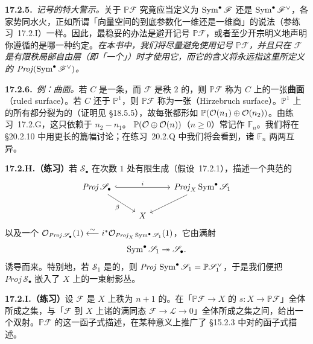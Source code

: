 \textbf{17.2.5.}\ \emph{记号的特大警示。}\quad 关于 $\mathbb{P}\mathscr{F}$ 究竟应当定义为 $\operatorname{Sym}^\bullet\mathscr{F}$ 还是 $\operatorname{Sym}^\bullet\mathscr{F}^\vee$，各家势同水火，正如所谓「向量空间的\trProjectivization{}到底参数化一维\trSubspace{}还是一维商」的说法（参\mbox{练习~17.2.I}）一样。因此，最稳妥的办法是避开记号 $\mathbb{P}\mathscr{F}$，或者至少开宗明义地声明你遵循的是哪一种约定。\emph{在本书中，我们将尽量避免使用记号 $\mathbb{P}\mathscr{F}$，并且只在 $\mathscr{F}$ 是有限秩局部自由层（即「一个\trVectorBundle」）时才使用它，而它的含义将永远指这里所定义的 $\mathit{Proj}(\operatorname{Sym}^\bullet\mathscr{F}^\vee)$。}

\textbf{17.2.6.}\ \emph{例：\trRuling{}曲面。}\quad 若 $C$ 是一条\trRegular\trCurve，而 $\mathscr{F}$ 是秩 $2$ 的\trLocallyFreeSheaf，则 $\mathbb{P}\mathscr{F}$ 称为 $C$ 上的一张\textbf{\trRuling{}曲面}（ruled surface）。若 $C$ 还\trIsomorphic{}于 $\mathbb{P}^1$，则 $\mathbb{P}\mathscr{F}$ 称为一张\textbf{\trHirzebruchSurface}（Hirzebruch surface）。$\mathbb{P}^1$ 上的所有\trVectorBundle{}都分裂为\trLineBundle{}的\trDirectSum（证明见 \S18.5.5），故每张\trHirzebruchSurface{}都形如 $\mathbb{P}(\mathcal{O}(n_1)\oplus\mathcal{O}(n_2))$。由\mbox{练习~17.2.G}，这只依赖于 $n_2-n_1$。\trHirzebruchSurface{} $\mathbb{P}(\mathcal{O}\oplus\mathcal{O}(n))$（$n\ge0$）常记作 $\mathbb{F}_n$。我们将在 \S20.2.10 中用更长的篇幅讨论\trHirzebruchSurface{}；在\mbox{练习~20.2.Q} 中我们将会看到，诸 $\mathbb{F}_n$ 两两互异。

\textbf{17.2.H.（练习）}\quad 若 $\mathscr{S}_\bullet$ 在次数 $1$ 处有限生成（\mbox{假设~17.2.1}），描述一个典范的\trClosedEmbedding
\[
\begin{tikzcd}
\mathit{Proj}\,\mathscr{S}_\bullet \ar[rr, hook, "i"] \ar[dr, "\beta"'] && \mathit{Proj}_X\Sym^\bullet\mathscr{S}_1 \ar[dl] \\
& X &
\end{tikzcd}
\]
以及一个\trIsomorphism{} $\mathcal{O}_{\mathit{Proj}\,\mathscr{S}_\bullet}(1)\overset{\sim}{\longleftarrow}i^*\mathcal{O}_{\mathit{Proj}_X\operatorname{Sym}^\bullet\mathscr{S}_1}(1)$，它由满射
\[
\operatorname{Sym}^\bullet\mathscr{S}_1\twoheadrightarrow\mathscr{S}_\bullet.
\]
诱导而来。特别地，若 $\mathscr{S}_1$ 是\trLocallyFree{}的，则 $\mathit{Proj}\,\operatorname{Sym}^\bullet\mathscr{S}_1=\mathbb{P}\mathscr{S}_1^\vee$，于是我们便把 $\mathit{Proj}\,\mathscr{S}_\bullet$ 嵌入了 $X$ 上的一束射影丛。

\textbf{17.2.I.（练习）}\quad 设 $\mathscr{F}$ 是 $X$ 上秩为 $n+1$ 的\trLocallyFreeSheaf。在「$\mathbb{P}\mathscr{F}\to X$ 的\trSection{} $s\colon X\to\mathbb{P}\mathscr{F}$」全体所成之集，与「$\mathscr{F}$ 到 $X$ 上诸\trInvertibleSheaf{}的满同态 $\mathscr{F}\to\mathscr{L}\to 0$」全体所成之集之间，给出一个双射。$\mathbb{P}\mathscr{F}$ 的这一函子式描述，在某种意义上推广了 \S15.2.3 中对\trProjectiveSpace{}的函子式描述。

